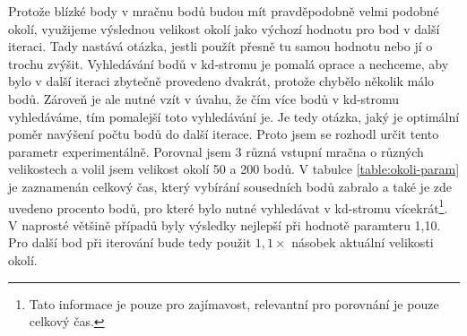 \documentclass[11pt,twoside,a4paper]{book}
\begin{document}
Protože blízké body v mračnu bodů budou mít pravděpodobně velmi podobné okolí, využijeme výslednou velikost okolí jako výchozí hodnotu pro bod v další iteraci. Tady nastává otázka, jestli použít přesně tu samou hodnotu nebo jí o trochu zvýšit. Vyhledávání bodů v kd-stromu je pomalá oprace a nechceme, aby bylo v další iteraci zbytečně provedeno dvakrát, protože chybělo několik málo bodů. Zároveň je ale nutné vzít v úvahu, že čím více bodů v kd-stromu vyhledáváme, tím pomalejší toto vyhledávání je. Je tedy otázka, jaký je optimální poměr navýšení počtu bodů do další iterace. Proto jsem se rozhodl určit tento parametr experimentálně. Porovnal jsem 3 různá vstupní mračna o různých velikostech a volil jsem velikost okolí 50 a 200 bodů. V tabulce \ref{table:okoli-param} je zaznamenán celkový čas, který vybírání sousedních bodů zabralo a také je zde uvedeno procento bodů, pro které bylo nutné vyhledávat v kd-stromu vícekrát\footnote{Tato informace je pouze pro zajímavost, relevantní pro porovnání je pouze celkový čas.}. V naprosté většině případů byly výsledky nejlepší při hodnotě paramteru 1,10. Pro další bod při iterování bude tedy použit $1,1\times$ násobek aktuální velikosti okolí.
\end{document}
